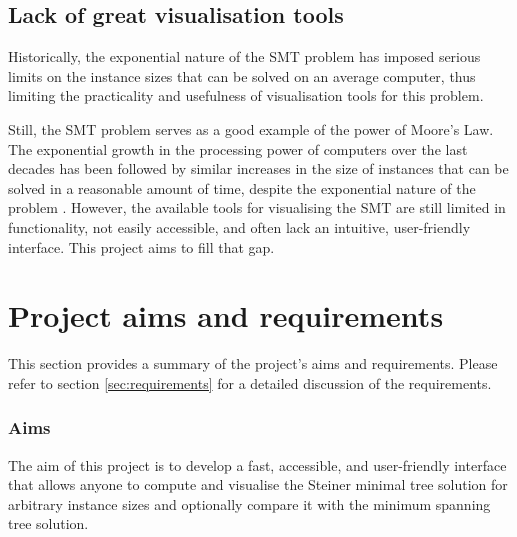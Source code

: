 \documentclass{l4proj}
\begin{document}
\subsection{Lack of great visualisation tools}
Historically, the exponential nature of the SMT problem has imposed serious limits on the instance sizes that can be solved on an average computer, thus limiting the practicality and usefulness of visualisation tools for this problem.

Still, the SMT problem serves as a good example of the power of Moore's Law. The exponential growth in the processing power of computers over the last decades has been followed by similar increases in the size of instances that can be solved in a reasonable amount of time, despite the exponential nature of the problem \citep{29ee725d11ac4584b72f7fe66c4326fa}.
However, the available tools for visualising the SMT are still limited in functionality, not easily accessible, and often lack an intuitive, user-friendly interface.
This project aims to fill that gap.





\section{Project aims and requirements}
This section provides a summary of the project's aims and requirements. Please refer to section \ref{sec:requirements} for a detailed discussion of the requirements.

\subsubsection{Aims}
The aim of this project is to develop a fast, accessible, and user-friendly interface that allows anyone to compute and visualise the Steiner minimal tree solution for arbitrary instance sizes and optionally compare it with the minimum spanning tree solution.
\end{document}
